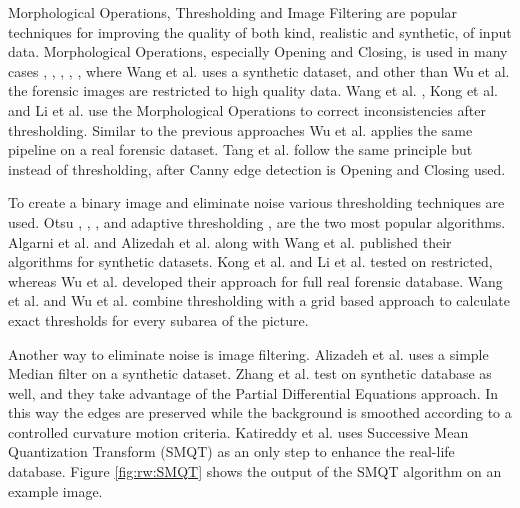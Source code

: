 \documentclass[draft,final]{vutinfth} %
\begin{document}
\par
Morphological Operations, Thresholding and Image Filtering are popular techniques for improving the quality of both kind, realistic and synthetic, of input data.
Morphological Operations, especially Opening and Closing, is used in many cases \cite{wang2014automatic}, \cite{kong2014novel}, \cite{li2014retrieval}, \cite{tang2010footwear}, \cite{wu2019crime}, where Wang et al. \cite{wang2014automatic} uses a synthetic dataset, and other than Wu et al. \cite{wu2019crime} the forensic images are restricted to high quality data.
Wang et al. \cite{wang2014automatic}, Kong et al.  \cite{kong2014novel} and Li et al. \cite{li2014retrieval} use the Morphological Operations to correct inconsistencies after thresholding.
Similar to the previous approaches Wu et al. \cite{wu2019crime} applies the same pipeline on a real forensic dataset.
Tang et al. \cite{tang2010footwear} follow the same principle but instead of thresholding, after Canny edge detection is Opening and Closing used.
\par
To create a binary image and eliminate noise various thresholding techniques are used.
Otsu  \cite{wu2019crime}, \cite{algarni2008novel}, \cite{alizadeh2017automatic}, \cite{kong2014novel} and adaptive thresholding \cite{wang2014automatic}, \cite{li2014retrieval} are the two most popular algorithms.
Algarni et al. \cite{algarni2008novel} and Alizedah et al. \cite{alizadeh2017automatic} along with Wang et al. \cite{wang2014automatic} published their algorithms for synthetic datasets.
Kong et al. \cite{kong2014novel} and Li et al. \cite{li2014retrieval} tested on restricted, whereas Wu et al. \cite{wu2019crime} developed their approach for full real forensic database.
Wang et al. \cite{wang2014automatic} and Wu et al. \cite{wu2019crime} combine thresholding with a grid based approach to calculate exact thresholds for every subarea of the picture.
\par
Another way to eliminate noise is image filtering.
Alizadeh et al. \cite{alizadeh2017automatic} uses a simple Median filter on a synthetic dataset.
Zhang et al. \cite{zhang2005automatic} test on synthetic database as well, and they take advantage of the Partial Differential Equations approach.
In this way the edges are preserved while the background is smoothed according to a controlled curvature motion criteria. 
Katireddy et al. \cite{katireddy2017novel} uses Successive Mean Quantization Transform (SMQT) \cite{nilsson2013smqt} as an only step to enhance the real-life database.
Figure \ref{fig:rw:SMQT} shows the output of the SMQT algorithm on an example image.
\end{document}
